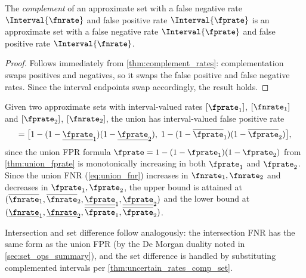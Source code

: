 \begin{theorem}[Complement]
\label{thm:uncertain_rates_comp_set}
The \emph{complement} of an approximate set with a false negative rate $\Interval{\fnrate}$ and false positive rate $\Interval{\fprate}$ is an approximate set with a false negative rate $\Interval{\fprate}$ and false positive rate $\Interval{\fnrate}$.
\end{theorem}
\begin{proof}
Follows immediately from \cref{thm:complement_rates}: complementation swaps positives and negatives, so it swaps the false positive and false negative rates. Since the interval endpoints swap accordingly, the result holds.
\end{proof}

\begin{theorem}[Union]
\label{thm:uncertain_rates_union}
Given two approximate sets with interval-valued rates $[\fprate_1]$, $[\fnrate_1]$ and $[\fprate_2]$, $[\fnrate_2]$, the union has interval-valued false positive rate
\begin{equation}
[\fprate] = \bigl[1 - (1 - \underline{\fprate}_1)(1 - \underline{\fprate}_2),\;
             1 - (1 - \overline{\fprate}_1)(1 - \overline{\fprate}_2)\bigr],
\end{equation}
since the union FPR formula $\fprate = 1 - (1-\fprate_1)(1-\fprate_2)$ from \cref{thm:union_fprate} is monotonically increasing in both $\fprate_1$ and $\fprate_2$.
Since the union FNR (\cref{eq:union_fnr}) increases in $\fnrate_1, \fnrate_2$ and decreases in $\fprate_1, \fprate_2$, the upper bound is attained at $(\overline{\fnrate}_1, \overline{\fnrate}_2, \underline{\fprate}_1, \underline{\fprate}_2)$ and the lower bound at $(\underline{\fnrate}_1, \underline{\fnrate}_2, \overline{\fprate}_1, \overline{\fprate}_2)$.
\end{theorem}

\begin{remark}
Intersection and set difference follow analogously: the intersection FNR has the same form as the union FPR (by the De Morgan duality noted in \cref{sec:set_ops_summary}), and the set difference is handled by substituting complemented intervals per \cref{thm:uncertain_rates_comp_set}.
\end{remark}


